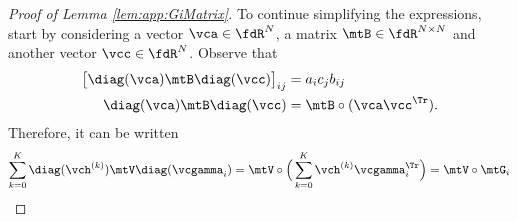 \begin{proof}[Proof of Lemma \ref{lem:app:GiMatrix}]
To continue simplifying the expressions, start by considering a vector $\vca \in \fdR^{N}$, a matrix $\mtB \in \fdR^{N \times N}$ and another vector $\vcc \in \fdR^{N}$. Observe that
%
\begin{align*}
    \big[ \diag(\vca) \mtB \diag(\vcc)\big]_{ij} & = a_{i}c_{j}b_{ij} \\
    \diag(\vca) \mtB \diag(\vcc) & = \mtB \circ (\vca \vcc^{\Tr}).
\end{align*}
%
Therefore, it can be written
%
\begin{equation}
    \sum_{k=0}^{K} \diag(\vch^{(k)}) \mtV \diag(\vcgamma_{i}) = \mtV \circ \Big( \sum_{k=0}^{K} \vch^{(k)} \vcgamma_{i}^{\Tr} \Big) = \mtV \circ \mtG_{i}
\end{equation}

\end{proof}
